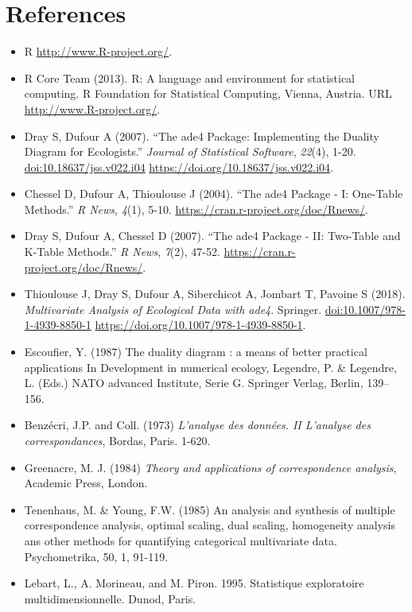\documentclass[
  10pt,
]{article}
\providecommand{\tightlist}{%
  \setlength{\itemsep}{0pt}\setlength{\parskip}{0pt}}
\begin{document}
\hypertarget{references}{%
\section{References}\label{references}}

\begin{itemize}
\tightlist
\item
  R \url{http://www.R-project.org/}.
\item
  R Core Team (2013). R: A language and environment for statistical
  computing. R Foundation for Statistical Computing, Vienna, Austria.
  URL \url{http://www.R-project.org/}.
\item
  Dray S, Dufour A (2007). ``The ade4 Package: Implementing the Duality
  Diagram for Ecologists.'' \emph{Journal of Statistical Software},
  \emph{22}(4), 1-20. \url{doi:10.18637/jss.v022.i04}
  \url{https://doi.org/10.18637/jss.v022.i04}.
\item
  Chessel D, Dufour A, Thioulouse J (2004). ``The ade4 Package - I:
  One-Table Methods.'' \emph{R News}, \emph{4}(1), 5-10.
  \url{https://cran.r-project.org/doc/Rnews/}.
\item
  Dray S, Dufour A, Chessel D (2007). ``The ade4 Package - II: Two-Table
  and K-Table Methods.'' \emph{R News}, \emph{7}(2), 47-52.
  \url{https://cran.r-project.org/doc/Rnews/}.
\item
  Thioulouse J, Dray S, Dufour A, Siberchicot A, Jombart T, Pavoine S
  (2018). \emph{Multivariate Analysis of Ecological Data with ade4}.
  Springer. \url{doi:10.1007/978-1-4939-8850-1}
  \url{https://doi.org/10.1007/978-1-4939-8850-1}.
\item
  Escoufier, Y. (1987) The duality diagram : a means of better practical
  applications In Development in numerical ecology, Legendre, P. \&
  Legendre, L. (Eds.) NATO advanced Institute, Serie G. Springer Verlag,
  Berlin, 139--156.
\item
  Benzécri, J.P. and Coll. (1973) \emph{L'analyse des données. II
  L'analyse des correspondances}, Bordas, Paris. 1-620.
\item
  Greenacre, M. J. (1984) \emph{Theory and applications of
  correspondence analysis}, Academic Press, London.
\item
  Tenenhaus, M. \& Young, F.W. (1985) An analysis and synthesis of
  multiple correspondence analysis, optimal scaling, dual scaling,
  homogeneity analysis ans other methods for quantifying categorical
  multivariate data. Psychometrika, 50, 1, 91-119.
\item
  Lebart, L., A. Morineau, and M. Piron. 1995. Statistique exploratoire
  multidimensionnelle. Dunod, Paris.
\end{itemize}
\end{document}
